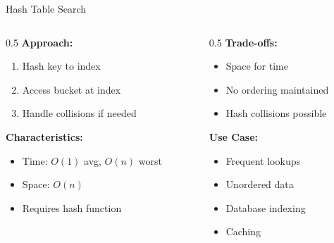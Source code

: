 \documentclass[aspectratio=169,xcolor=dvipsnames]{beamer}
\begin{document}
\begin{frame}{Hash Table Search}
  \begin{columns}
    \begin{column}{0.5\textwidth}
      \textbf{Approach:}
      \begin{enumerate}
        \item Hash key to index
        \item Access bucket at index
        \item Handle collisions if needed
      \end{enumerate}

      \vspace{0.3cm}
      \textbf{Characteristics:}
      \begin{itemize}
        \item Time: $O(1)$ avg, $O(n)$ worst
        \item Space: $O(n)$
        \item Requires hash function
      \end{itemize}
    \end{column}

    \begin{column}{0.5\textwidth}
      \textbf{Trade-offs:}
      \begin{itemize}
        \item Space for time
        \item No ordering maintained
        \item Hash collisions possible
      \end{itemize}

      \vspace{0.3cm}
      \textbf{Use Case:}
      \begin{itemize}
        \item Frequent lookups
        \item Unordered data
        \item Database indexing
        \item Caching
      \end{itemize}
    \end{column}
  \end{columns}
\end{frame}
\end{document}
